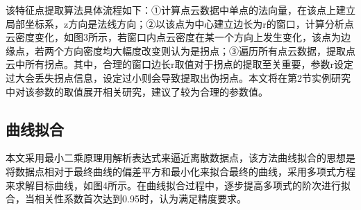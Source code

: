 该特征点提取算法具体流程如下：①计算点云数据中单点的法向量，在该点上建立局部坐标系，z方向是法线方向；②以该点为中心建立边长为r的窗口，计算分析点云密度变化，如图3所示，若窗口内点云密度在某一个方向上发生变化，该点为边缘点，若两个方向密度均大幅度改变则认为是拐点；③遍历所有点云数据，提取点云中所有拐点。其中，合理的窗口边长r取值对于拐点的提取至关重要，参数r设定过大会丢失拐点信息，设定过小则会导致提取出伪拐点。本文将在第2节实例研究中对该参数的取值展开相关研究，建议了较为合理的参数值。


\subsection{曲线拟合}
本文采用最小二乘原理用解析表达式来逼近离散数据点，该方法曲线拟合的思想是将数据点相对于最终曲线的偏差平方和最小化来拟合最终的曲线，采用多项式方程来求解目标曲线，如图4所示。在曲线拟合过程中，逐步提高多项式的阶次进行拟合，当相关性系数首次达到0.95时，认为满足精度要求。